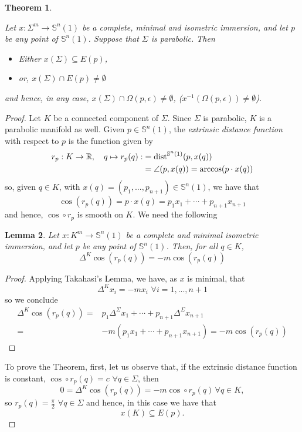 \documentclass{amsart}
\newtheorem{theorem}{Theorem}[section]
\newtheorem{lemma}[theorem]{Lemma}
\theoremstyle{definition}
\theoremstyle{remark}
\providecommand{\DIFadd}[1]{{\protect\color{blue}\uwave{#1}}} %
\providecommand{\DIFdel}[1]{{\protect\color{red}\sout{#1}}}                      %
\providecommand{\DIFaddbegin}{} %
\providecommand{\DIFaddend}{} %
\providecommand{\DIFdelbegin}{} %
\providecommand{\DIFdelend}{} %
\begin{document}
\begin{theorem}\label{twopiecegeneral}

Let $x:\Sigma^m \to \mathbb{S}^n(1)$ be a complete,  minimal and isometric immersion, and let $p$ be any point of $\mathbb{S}^n(1)$. Suppose that $\Sigma$ is parabolic. Then
    \begin{itemize}
        \item Either $x(\Sigma)\subseteq E(p)$, 
        \item or, $x(\Sigma)\cap E(p)\neq \emptyset$
            \end{itemize}
            and  hence, in any case,  $x(\Sigma) \cap \Omega(p,\epsilon) \neq \emptyset$, ($x^{-1}(\Omega(p,\epsilon))\neq \emptyset$).
\end{theorem}

\begin{proof}
Let $K$ be a connected component of $\Sigma$. Since $\Sigma$ is parabolic, $K$ is a parabolic manifold as well.
Given $p\in \mathbb{S}^n(1)$, the \emph{extrinsic distance function} with respect to $p$ is the function given by
$$
\begin{aligned}
r_p:K \to \mathbb{R}, \quad q\mapsto r_p(q):&={\rm dist}^{\mathbb{S}^n(1)}(p,x(q))\\&=\angle{(p,x(q))}=\arccos(p\cdot x(q))
\end{aligned}
$$
so, given $q \in K$, with \DIFdelbegin \DIFdel{$x(q)=(p_1,...,p_{n+1}) \in \mathbb{S}^n(1)$}\DIFdelend \DIFaddbegin \DIFadd{$x(q)=(x_1,...,x_{n+1}) \in \mathbb{S}^n(1)$}\DIFaddend , we have that
$$
\cos(r_p(q))=p\cdot x(q) = p_1x_1+\cdots+p_{n+1}x_{n+1}
$$
 and hence, $\cos\circ r_p$ is smooth on $K$.   We need the following
\begin{lemma}\label{coslema}
Let $x:K^m \to \mathbb{S}^n(1)$ be a complete and minimal isometric immersion, and let $p$ be any point of $\mathbb{S}^n(1)$. Then, for all $q \in K$,
 \begin{equation}\label{cos}
\Delta^K \cos(r_p(q))=-m\cos(r_p(q))
\end{equation}
\end{lemma}
\begin{proof}
  Applying Takahasi's Lemma, \DIFaddbegin \DIFadd{(see \mbox{%
\cite{Tak}}\hskip0pt%
), }\DIFaddend we have,  as $x$ is minimal, that 
  $$\Delta^K x_i=-m x_i\,\,\forall i=1,...,n+1$$
  so we conclude 
$$
\begin{aligned}
\Delta^K \cos(r_p(q))=&p_1\Delta^\Sigma x_1+\cdots+p_{n+1}\Delta^\Sigma x_{n+1}\\=&-m\left(p_1x_1+\cdots+p_{n+1}x_{n+1}\right)=-m\cos(r_p(q))
\end{aligned}
$$\end{proof}
To prove  the Theorem, first, let us observe that, if the extrinsic distance function is constant,
$\cos\circ r_p(q)=c \,\,\forall q \in \Sigma$, then 
$$0=\Delta^K \cos(r_p(q))=-m\cos\circ r_p(q)\,\forall q \in K,$$
so $r_p(q)=\frac{\pi}{2} \,\,\forall q \in \Sigma$ and hence, in this case we have that $$x(K) \subseteq E(p).$$


\end{proof}
\end{document}

